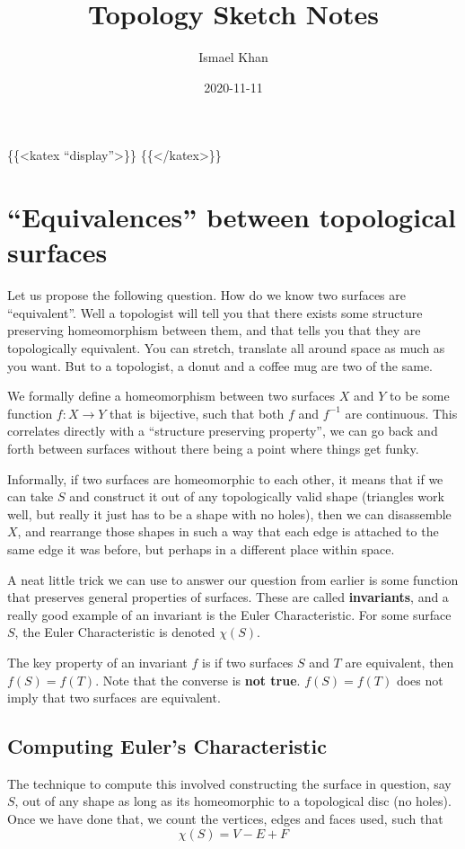 \documentclass[11pt]{article}
\author{Ismael Khan}
\date{2020-11-11}
\title{Topology Sketch Notes}
\begin{document}
\maketitle
\tableofcontents

\{\{<katex ``display''>\}\}
\{\{</katex>\}\}
\section{``Equivalences'' between topological surfaces}
\label{sec:org5a6cc01}
Let us propose the following question. How do we know two surfaces are ``equivalent''. Well a topologist will tell you that there exists some structure preserving homeomorphism between them, and that tells you that they are topologically equivalent. You can stretch, translate all around space as much as you want. But to a topologist, a donut and a coffee mug are two of the same.

We formally define a homeomorphism between two surfaces \(X\) and \(Y\) to be some function \(f : X\to Y\) that is bijective, such that both \(f\) and \(f^{-1}\) are continuous. This correlates directly with a ``structure preserving property'', we can go back and forth between surfaces without there being a point where things get funky.

Informally, if two surfaces are homeomorphic to each other, it means that if we can take \(S\) and construct it out of any topologically valid shape (triangles work well, but really it just has to be a shape with no holes), then we can disassemble \(X\), and rearrange those shapes in such a way that each edge is attached to the same edge it was before, but perhaps in a different place within space.

A neat little trick we can use to answer our question from earlier is some function that preserves general properties of surfaces. These are called \textbf{invariants}, and a really good example of an invariant is the Euler Characteristic. For some surface \(S\), the Euler Characteristic is denoted \(\chi(S)\).

The key property of an invariant \(f\) is if two surfaces \(S\) and \(T\) are equivalent, then \(f(S) = f(T)\). Note that the converse is \textbf{not true}. \(f(S) = f(T)\) does not imply that two surfaces are equivalent.

\subsection{Computing Euler's Characteristic}
\label{sec:org5d4b618}
The technique to compute this involved constructing the surface in question, say \(S\), out of any shape as long as its homeomorphic to a topological disc (no holes). Once we have done that, we count the vertices, edges and faces used, such that
\[
\chi(S) = V - E + F
\]
\end{document}
